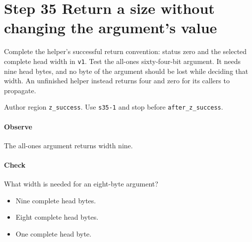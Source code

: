 \section{Step 35 Return a size without changing the argument's value}\label{cbor-s35}
Complete the helper's successful return convention: status zero and the selected complete head width in \texttt{v1}. Test the all-ones sixty-four-bit argument. It needs nine head bytes, and no byte of the argument should be lost while deciding that width. An unfinished helper instead returns four and zero for its callers to propagate.

Author region \texttt{z\_success}. Use \texttt{s35-1} and stop before \texttt{after\_z\_success}.

\paragraph{Observe} The all-ones argument returns width nine.

\paragraph{Check} What width is needed for an eight-byte argument?
\begin{itemize}
  \item[A.] Nine complete head bytes.
  \item[B.] Eight complete head bytes.
  \item[C.] One complete head byte.
\end{itemize}

